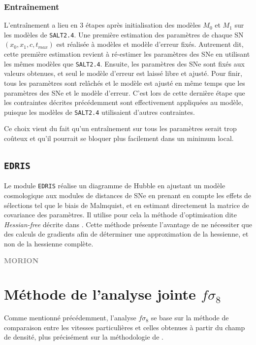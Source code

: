 \documentclass{book}
\newcommand{\todo}[1]{{\textcolor{gray}{\bf \large #1}}}
\def\edris{\texttt{EDRIS}\xspace}
\def\saltd{\texttt{SALT2.4}\xspace}
\begin{document}
 \subsubsection{Entraînement}

L'entraînement a lieu en 3 étapes après initialisation des modèles $M_0$ et $M_1$ sur les modèles de \saltd. Une première estimation des paramètres de chaque SN $(x_0, x_1, c, t_{max})$ est réalisée à modèles et modèle d'erreur fixés. Autrement dit, cette première estimation revient à ré-estimer les paramètres des SNe en utilisant les mêmes modèles que \saltd. Ensuite, les paramètres des SNe sont fixés aux valeurs obtenues, et seul le modèle d'erreur est laissé libre et ajusté. Pour finir, tous les paramètres sont relâchés et le modèle est ajusté en même temps que les paramètres des SNe et le modèle d'erreur. C'est lors de cette dernière étape que les contraintes décrites précédemment sont effectivement appliquées au modèle, puisque les modèles de \saltd utilisaient d'autres contraintes.

Ce choix vient du fait qu'un entraînement sur tous les paramètres serait trop coûteux et qu'il pourrait se bloquer plus facilement dans un minimum local.

\subsection{\edris}
\label{anx:edris}

Le module \edris réalise un diagramme de Hubble en ajustant un modèle cosmologique aux modules de distances de SNe en prenant en compte les effets de sélections tel que le biais de Malmquist, et en estimant directement la matrice de covariance des paramètres. Il utilise pour cela la méthode d'optimisation dite \textit{Hessian-free} décrite dans \cite{martens_deep_2010}. Cette méthode présente l'avantage de ne nécessiter que des calculs de gradients afin de déterminer une approximation de la hessienne, et non de la hessienne complète.

\todo{MORION}





\section{Méthode de l'analyse jointe $f\sigma_8$}
\label{anx:fs8}

Comme mentionné précédemment, l'analyse $f\sigma_8$ se base sur la méthode de comparaison entre les vitesses particulières et celles obtenues à partir du champ de densité, plus précisément sur la méthodologie de \cite{stahl_peculiar-velocity_2021}.
\end{document}

